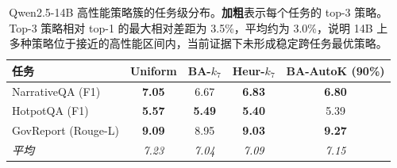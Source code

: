 \begin{table}[!htbp]
  \centering
  \small
  \setlength{\tabcolsep}{5pt}
  \begin{tabular}{l cccc}
    \toprule
    \textbf{任务} & Uniform & BA-$k_7$ & Heur-$k_7$ & BA-AutoK (90\%) \\
    \midrule
    NarrativeQA (F1) & \textbf{7.05} & 6.67 & \textbf{6.83} & \textbf{6.80} \\
    HotpotQA (F1) & \textbf{5.57} & \textbf{5.49} & \textbf{5.40} & 5.39 \\
    GovReport (Rouge-L) & \textbf{9.09} & 8.95 & \textbf{9.03} & \textbf{9.27} \\
    \midrule
    \textit{平均} & \textit{7.23} & \textit{7.04} & \textit{7.09} & \textit{7.15} \\
    \bottomrule
  \end{tabular}
  \caption{Qwen2.5-14B 高性能策略簇的任务级分布。\textbf{加粗}表示每个任务的 top-3 策略。Top-3 策略相对 top-1 的最大相对差距为 3.5\%，平均约为 3.0\%，说明 14B 上多种策略位于接近的高性能区间内，当前证据下未形成稳定跨任务最优策略。}
  \label{tab:t6-14b-toptier}
  \par\smallskip{}
\end{table}
